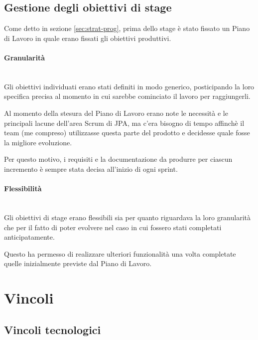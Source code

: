 \subsection{Gestione degli obiettivi di stage}

Come detto in sezione \ref{sec:strat-prog}, prima dello stage è stato fissato
un Piano di Lavoro in quale erano fissati gli obiettivi produttivi.

\paragraph{Granularità} \mbox{} \\

Gli obiettivi individuati erano stati definiti in modo generico, posticipando
la loro specifica precisa al momento in cui sarebbe cominciato il lavoro per
raggiungerli.

Al momento della stesura del Piano di Lavoro erano note le necessità e le
principali lacune dell'area Scrum di JPA, ma c'era bisogno di tempo affinchè
il team (me compreso) utilizzasse questa parte del prodotto e decidesse quale
fosse la migliore evoluzione.

Per questo motivo, i requisiti e la documentazione da produrre per ciascun
incremento è sempre stata decisa all'inizio di ogni sprint.

\paragraph{Flessibilità} \mbox{} \\

Gli obiettivi di stage erano flessibili sia per quanto riguardava la loro
granularità che per il fatto di poter evolvere nel caso in cui fossero stati
completati anticipatamente.

Questo ha permesso di realizzare ulteriori funzionalità una volta completate
quelle inizialmente previste dal Piano di Lavoro.

\section{Vincoli}

\subsection{Vincoli tecnologici}


